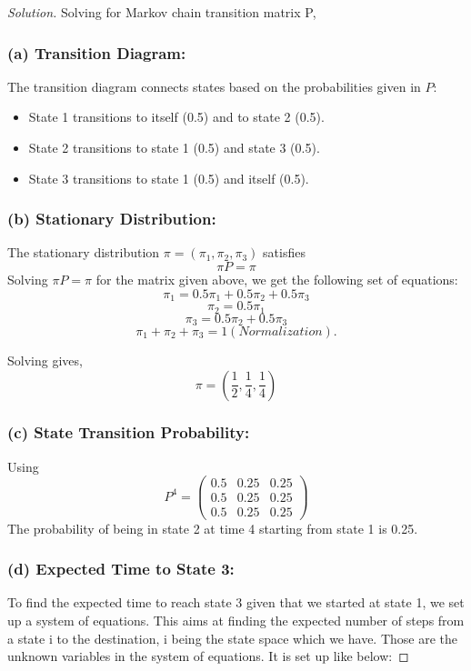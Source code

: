\documentclass[12pt]{article}
\newenvironment{solution}{\begin{proof}[Solution]}{\end{proof}}
\begin{document}
\begin{solution}
Solving for Markov chain transition matrix P, 
\subsubsection*{(a) Transition Diagram:}
The transition diagram connects states based on the probabilities given in $P$:
\begin{itemize}
    \item State 1 transitions to itself (0.5) and to state 2 (0.5).
    \item State 2 transitions to state 1 (0.5) and state 3 (0.5).
    \item State 3 transitions to state 1 (0.5) and itself (0.5).
\end{itemize}


\subsubsection*{(b) Stationary Distribution:}
The stationary distribution $\pi = (\pi_1, \pi_2, \pi_3)$ satisfies\\ 
$$\pi P = \pi$$ 
Solving $\pi P = \pi$ for the matrix given above, we get the following set of equations:\\
$$\pi_1 = 0.5\pi_1 + 0.5\pi_2 + 0.5\pi_3$$\smallskip
$$\pi_2 = 0.5\pi_1$$\smallskip
$$\pi_3 = 0.5\pi_2 + 0.5\pi_3$$\smallskip
$$\pi_1 + \pi_2 + \pi_3 = 1 (Normalization).$$

Solving gives, \\ $$\pi = \left(\frac{1}{2}, \frac{1}{4}, \frac{1}{4}\right)$$

\subsubsection*{(c) State Transition Probability:}
Using 
\[
P^4 =
\begin{pmatrix}
0.5 & 0.25 & 0.25 \\
0.5 & 0.25 & 0.25 \\
0.5 & 0.25 & 0.25
\end{pmatrix}
\]
The probability of being in state 2 at time 4 starting from state 1 is 0.25.

\subsubsection*{(d) Expected Time to State 3:}
To find the expected time to reach state 3 given that we started at state 1, we set up a system of equations. This aims at finding the expected number of steps from a state i to the destination, i being the state space which we have. Those are the unknown variables in the system of equations. It is set up like below:


\end{solution}
\end{document}
